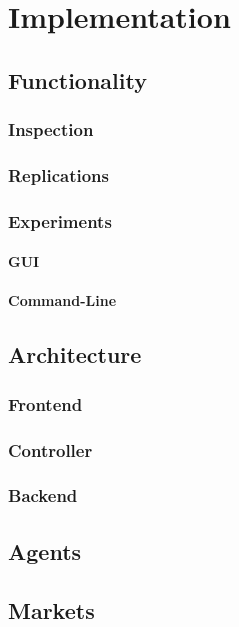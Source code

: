 \documentclass[Bachelorarbeit.tex]{subfiles}
\begin{document}
\chapter{Implementation}

\section{Functionality}

\subsection{Inspection}

\subsection{Replications}

\subsection{Experiments}
\subsubsection{GUI}
\subsubsection{Command-Line}

\section{Architecture}
\subsection{Frontend}
\subsection{Controller}
\subsection{Backend}

\section{Agents}

\section{Markets}
\end{document}

